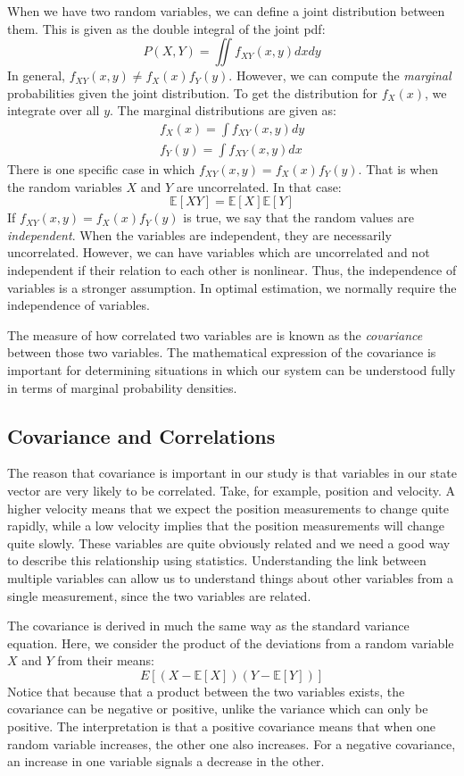When we have two random variables, we can define a joint distribution between them. This is given as the double integral of the joint \gls{pdf}:
$$P(X,Y)=\iint f_{XY}(x,y)dxdy$$
In general, $f_{XY}(x,y)\ne f_X(x)f_Y(y)$. However, we can compute the \textit{marginal} probabilities given the joint distribution. To get the distribution for $f_X(x)$, we integrate over all $y$. The marginal distributions are given as:
\begin{gather}
f_X(x)=\int f_{XY}(x,y)dy\\
f_Y(y)=\int f_{XY}(x,y)dx
\end{gather}
There is one specific case in which $f_{XY}(x,y)= f_X(x)f_Y(y)$. That is when the random variables $X$ and $Y$ are uncorrelated. In that case:
$$\mathbb{E}[XY]=\mathbb{E}[X]\mathbb{E}[Y]$$
If $f_{XY}(x,y)= f_X(x)f_Y(y)$ is true, we say that the random values are \textit{independent}. When the variables are independent, they are necessarily uncorrelated. However, we can have variables which are uncorrelated and not independent if their relation to each other is nonlinear. Thus, the independence of variables is a stronger assumption. In optimal estimation, we normally require the independence of variables.

The measure of how correlated two variables are is known as the \textit{covariance} between those two variables. The mathematical expression of the covariance is important for determining situations in which our system can be understood fully in terms of marginal probability densities.

\subsection{Covariance and Correlations}
The reason that covariance is important in our study is that variables in our state vector are very likely to be correlated. Take, for example, position and velocity. A higher velocity means that we expect the position measurements to change quite rapidly, while a low velocity implies that the position measurements will change quite slowly. These variables are quite obviously related and we need a good way to describe this relationship using statistics. Understanding the link between multiple variables can allow us to understand things about other variables from a single measurement, since the two variables are related.

The covariance is derived in much the same way as the standard variance equation. Here, we consider the product of the deviations from a random variable $X$ and $Y$ from their means:
$$E[(X-\mathbb{E}[X])(Y-\mathbb{E}[Y])]$$
Notice that because that a product between the two variables exists, the covariance can be negative or positive, unlike the variance which can only be positive. The interpretation is that a positive covariance means that when one random variable increases, the other one also increases. For a negative covariance, an increase in one variable signals a decrease in the other.

